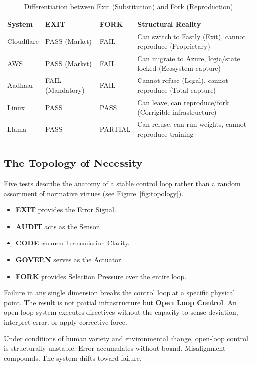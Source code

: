 \begin{table}[htbp]
\centering
\begin{tabular}{@{}llll@{}}
\toprule
\textbf{System} & \textbf{EXIT} & \textbf{FORK} & \textbf{Structural Reality} \\
\midrule
Cloudflare & PASS (Market) & FAIL & Can switch to Fastly (Exit), cannot reproduce (Proprietary) \\
AWS & PASS (Market) & FAIL & Can migrate to Azure, logic/state locked (Ecosystem capture) \\
Aadhaar & FAIL (Mandatory) & FAIL & Cannot refuse (Legal), cannot reproduce (Total capture) \\
Linux & PASS & PASS & Can leave, can reproduce/fork (Corrigible infrastructure) \\
Llama & PASS & PARTIAL & Can refuse, can run weights, cannot reproduce training \\
\bottomrule
\end{tabular}
\caption{Differentiation between Exit (Substitution) and Fork (Reproduction)}
\end{table}

\subsection{The Topology of Necessity}

Five tests describe the anatomy of a stable control loop rather than a random assortment of normative virtues (see Figure~\ref{fig:topology}).

\begin{itemize}[noitemsep,topsep=0pt]
    \item \textbf{EXIT} provides the Error Signal.
    \item \textbf{AUDIT} acts as the Sensor.
    \item \textbf{CODE} ensures Transmission Clarity.
    \item \textbf{GOVERN} serves as the Actuator.
    \item \textbf{FORK} provides Selection Pressure over the entire loop.
\end{itemize}

Failure in any single dimension breaks the control loop at a specific physical point. The result is not partial infrastructure but \textbf{Open Loop Control}. An open-loop system executes directives without the capacity to sense deviation, interpret error, or apply corrective force.

Under conditions of human variety and environmental change, open-loop control is structurally unstable. Error accumulates without bound. Misalignment compounds. The system drifts toward failure.

